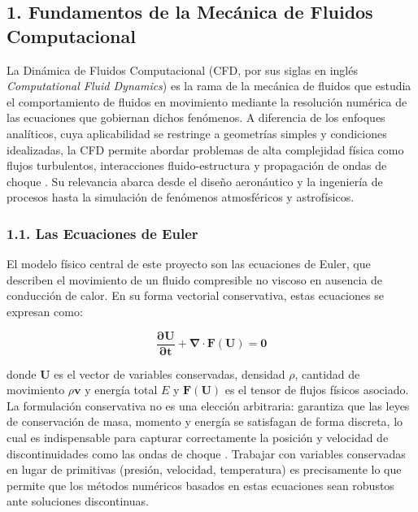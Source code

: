 \documentclass[11pt,openany]{book}
\begin{document}
    \subsection{1. Fundamentos de la Mecánica de Fluidos Computacional}

    La Dinámica de Fluidos Computacional (CFD, por sus siglas en inglés \textit{Computational Fluid Dynamics}) es la rama de la mecánica de fluidos que estudia el comportamiento de fluidos en movimiento mediante la resolución numérica de las ecuaciones que gobiernan dichos fenómenos. A diferencia de los enfoques analíticos, cuya aplicabilidad se restringe a geometrías simples y condiciones idealizadas, la CFD permite abordar problemas de alta complejidad física como flujos turbulentos, interacciones fluido-estructura y propagación de ondas de choque \parencite{raman2018review}. Su relevancia abarca desde el diseño aeronáutico y la ingeniería de procesos hasta la simulación de fenómenos atmosféricos y astrofísicos.

        \subsubsection{1.1. Las Ecuaciones de Euler}\textbf{}

        El modelo físico central de este proyecto son las ecuaciones de Euler, que describen el movimiento de un fluido compresible no viscoso en ausencia de conducción de calor. En su forma vectorial conservativa, estas ecuaciones se expresan como:

        \begin{equation}
        \frac{\mathbf{\partial U}}{\mathbf{\partial t}} + \mathbf{\nabla \cdot F(U) = 0}
        \end{equation}

        donde $\mathbf{U}$ es el vector de variables conservadas, densidad $\rho$, cantidad de movimiento $\rho \mathbf{v}$ y energía total $E$ y $\mathbf{F}(\mathbf{U})$ es el tensor de flujos físicos asociado. La formulación conservativa no es una elección arbitraria: garantiza que las leyes de conservación de masa, momento y energía se satisfagan de forma discreta, lo cual es indispensable para capturar correctamente la posición y velocidad de discontinuidades como las ondas de choque \parencite{toro2013riemann}. Trabajar con variables conservadas en lugar de primitivas (presión, velocidad, temperatura) es precisamente lo que permite que los métodos numéricos basados en estas ecuaciones sean robustos ante soluciones discontinuas.
\end{document}

